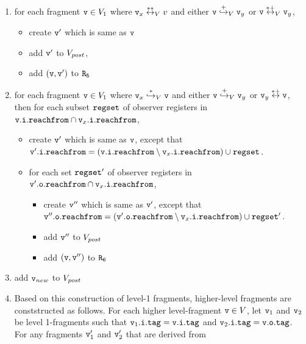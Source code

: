 \begin{enumerate}
\item for each fragment $\mathtt{v} \in V_1$ where $\mathtt{v}_x \overset{**}\leftrightarrow_{V} v$ and either $\mathtt{v} \overset{+}\hookrightarrow_{V} \mathtt{v}_y$ or $\mathtt{v} \overset{*+}\leftrightarrow_{V} \mathtt{v}_y$, 
\begin{itemize}
\item create $\mathtt{v}'$ which is same as $\mathtt{v}$
\item  add $\mathtt{v}'$ to $V_{post}$,
\item add $(\mathtt{v},\mathtt{v}')$ to $\tt R_5$

\end{itemize}


\item for each fragment $\mathtt{v} \in V_1$ where $\mathtt{v}_x \overset{*}\hookrightarrow_{V} \mathtt{v}$ and either $\mathtt{v} \overset{+}\hookrightarrow_{V} \mathtt{v}_y$ or $\mathtt{v}_y \overset{*+}\leftrightarrow \mathtt{v}$, then for each subset $\mathtt{regset}$ of observer registers in $\mathtt{v}.\mathtt{i}.\mathtt{reachfrom} \cap \mathtt{v}_x.\mathtt{i}.\mathtt{reachfrom}$, 
\begin{itemize}
\item create $\mathtt{v}'$ which is same as $\mathtt{v}$, except that $\mathtt{v}'.\mathtt{i}.\mathtt{reachfrom} = (\mathtt{v}.\mathtt{i}.\mathtt{reachfrom} \setminus \mathtt{v}_x.\mathtt{i}.\mathtt{reachfrom}) \cup \mathtt{regset}$. 
 \item for each set $\mathtt{regset}'$ of observer registers in $\mathtt{v}'.\mathtt{o}.\mathtt{reachfrom} \cap \mathtt{v}_x.\mathtt{i}.\mathtt{reachfrom}$,  
\begin{itemize}
\item create $\mathtt{v}''$ which is same as $\mathtt{v}'$, except that $\mathtt{v}''.\mathtt{o}.\mathtt{reachfrom} = (\mathtt{v}'.\mathtt{o}.\mathtt{reachfrom} \setminus \mathtt{v}_x.\mathtt{i}.\mathtt{reachfrom}) \cup \mathtt{regset}'$. 
\item add $\mathtt{v}''$ to $V_{post}$
\item add $(\mathtt{v},\mathtt{v}'')$ to $\tt R_6$
\end{itemize}
\end{itemize}
\item add $\mathtt{v}_{new}$ to $V_{post}$ 
\item
Based on this construction of level-1 fragments, higher-level fragments are
   conststructed as follows.
     For each higher level-fragment $\mathtt{v} \in V$, let
     $\mathtt{v}_1$ and $\mathtt{v}_2$ be level 1-fragments such that
     $\mathtt{v}_1.\mathtt{i}.\mathtt{tag} = \mathtt{v}.\mathtt{i}.\mathtt{tag}$ and
     $\mathtt{v}_2.\mathtt{i}.\mathtt{tag} = \mathtt{v}.\mathtt{o}.\mathtt{tag}$.
     For any fragments $\mathtt{v}_1'$ and $\mathtt{v}_2'$ that are derived from

\end{enumerate}
